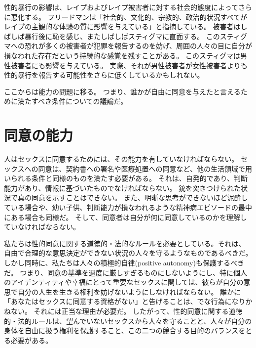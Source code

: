 \documentclass[paper=a4,book,openany]{jlreq}
\begin{document}
性的暴行の影響は、レイプおよびレイプ被害者に対する社会的態度によってさらに悪化する。
フリードマンは「社会的、文化的、宗教的、政治的状況すべてがレイプの主観的な体験の質に影響を与えている」と指摘している。
被害者はしばしば暴行後に恥を感じ、またしばしばスティグマに直面する。
このスティグマへの恐れが多くの被害者が犯罪を報告するのを妨げ、周囲の人々の目に自分が損なわれた存在だという持続的な感覚を残すことがある。
このスティグマは男性被害者にも影響を与えている。
実際、それが男性被害者が女性被害者よりも性的暴行を報告する可能性をさらに低くしているかもしれない\citep{mezey87:_male_victim_sexual_assaul}。

ここからは能力の問題に移る。
つまり、誰かが自由に同意を与えたと言えるために満たすべき条件についての議論だ。

\section{同意の能力}

人はセックスに同意するためには、その能力を有していなければならない。
セックスへの同意は、契約書への署名や医療処置への同意など、他の生活領域で用いられる条件と同様のものを満たす必要がある。
それは、自発的であり、判断能力があり、情報に基づいたものでなければならない。
銃を突きつけられた状況で真の同意を示すことはできない。
また、明晰な思考ができないほど泥酔している場合や、幼い子供、判断能力が損なわれるような精神病エピソードの最中にある場合も同様だ。
そして、同意者は自分が何に同意しているのかを理解していなければならない。

私たちは性的同意に関する道徳的・法的なルールを必要としている。それは、
自由で合理的な意思決定ができない状況の人々を守るようなものであるべきだ。
しかし同時に、私たちは人々の積極的自律(positive autonomy)も保護するべきだ。
つまり、同意の基準を過度に厳しすぎるものにしないようにし、特に個人のアイデンティティや幸福にとって重要なセックスに関しては、彼らが自分の意思で自分の人生を生きる権利を妨げないようにしなければならない。
誰かに「あなたはセックスに同意する資格がない」と告げることは、でな行為になりかねない。
それには正当な理由が必要だ。
したがって、性的同意に関する道徳的・法的ルールは、望んでいないセックスから人々を守ることと、人々が自分の身体を自由に扱う権利を保護すること、この二つの競合する目的のバランスをとる必要がある。
\end{document}
